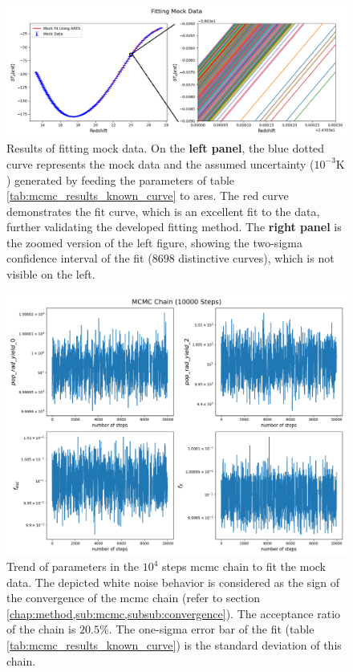 \documentclass[12pt, TexShade, letterpaper]{report}
\begin{document}
\begin{figure}[h!]
\centering
\includegraphics[scale =0.7]{fit_curve_mock.png}
\caption[Results of fitting mock data]{Results of fitting mock data. On the \textbf{left panel}, the blue dotted curve represents the mock data and the assumed uncertainty ($\mathrm{10^{-3}K}$) generated by feeding the parameters of table \ref{tab:mcmc_results_known_curve} to \gls{ares}. The red curve demonstrates the fit curve, which is an excellent fit to the data, further validating the developed fitting method. The \textbf{right panel} is the zoomed version of the left figure, showing the two-sigma confidence interval of the fit (8698 distinctive curves), which is not visible on the left.}
\label{fig:fit_curve_known_curve}
\end{figure}

\begin{figure}[h!]
\centering
\includegraphics[scale =0.5]{chain_known_curve.png}
\caption[Trend of parameters in the mock data \gls{mcmc} chain]{Trend of parameters in the $10^4$ steps \gls{mcmc} chain to fit the mock data. The depicted white noise behavior is considered as the sign of the convergence of the \gls{mcmc} chain (refer to section \ref{chap:method,sub:mcmc,subsub:convergence}). The acceptance ratio of the chain is $20.5\%$. The one-sigma error bar of the fit (table \ref{tab:mcmc_results_known_curve}) is the standard deviation of this chain.}
\label{fig:chain_known_curve}
\end{figure}
\end{document}
